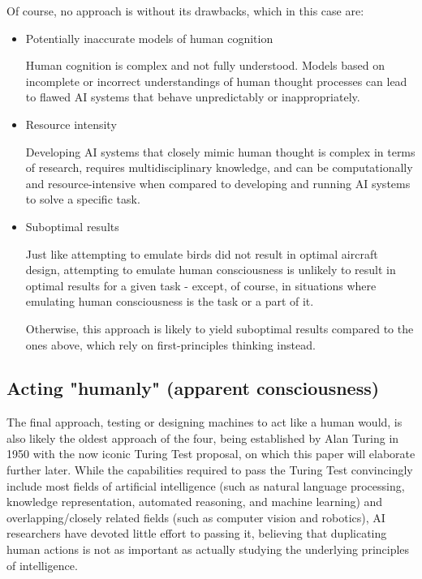 \documentclass[masterthesis]{fer}
\begin{document}
Of course, no approach is without its drawbacks, which in this case are:

\begin{itemize}
\item{Potentially inaccurate models of human cognition}

Human cognition is complex and not fully understood. Models based on incomplete or incorrect understandings of human thought processes can lead to flawed AI systems that behave unpredictably or inappropriately.
\item{Resource intensity}

Developing AI systems that closely mimic human thought is complex in terms of research, requires multidisciplinary knowledge, and can be computationally and resource-intensive when compared to developing and running AI systems to solve a specific task.
\item{Suboptimal results}

Just like attempting to emulate birds did not result in optimal aircraft design, attempting to emulate human consciousness is unlikely to result in optimal results for a given task - except, of course, in situations where emulating human consciousness is the task or a part of it.

Otherwise, this approach is likely to yield suboptimal results compared to the ones above, which rely on first-principles thinking instead.
\end{itemize}

\subsection{Acting "humanly" (apparent consciousness)}
The final approach, testing or designing machines to act like a human would, is also likely the oldest approach of the four, being established by Alan Turing in 1950 with the now iconic Turing Test proposal, on which this paper will elaborate further later.
While the capabilities required to pass the Turing Test convincingly include most fields of artificial intelligence (such as natural language processing, knowledge representation, automated reasoning, and machine learning) and overlapping/closely related fields (such as computer vision and robotics), AI researchers have devoted little effort to passing it, believing that duplicating human actions is not as important as actually studying the underlying principles of intelligence.
\end{document}
